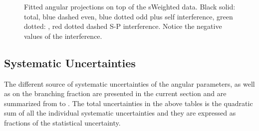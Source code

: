 \begin{figure}[!h]
\centering
  \begin{subfigure}{0.5\textwidth}
    \raggedright
    \scalebox{1.15}{}
    \caption{}
    \label{angPlot_ctk}
  \end{subfigure}%
  \hfill%
  \begin{subfigure}{0.5\textwidth}
    \raggedleft
    \scalebox{1.15}{}
    \caption{}
    \label{angPlot_ctl}
  \end{subfigure}
  \begin{subfigure}{0.5\textwidth}
    \raggedright
    \scalebox{1.15}{}
    \caption{}
    \label{angPlot_phi}
  \end{subfigure}
  \caption{Fitted angular \pdf projections on top of the \BsJpsiKst sWeighted data.
           Black solid: total, blue dashed \pwave even, blue dotted \pwave odd plus \pwave self interference,
           green dotted: \swave, red dotted dashed S-P interference. Notice the negative values of the \spwave interference.}
  \label{angular_plot}
\end{figure}



\subsection{Systematic Uncertainties}
\label{systemics}
The different source of systematic uncertainties of the \Bs angular parameters, as well as on the branching fraction
are presented in the current section and are summarized from  to .
The total uncertainties in the above tables is the quadratic sum of all the individual systematic uncertainties and
they are expressed as fractions of the statistical uncertainty.


